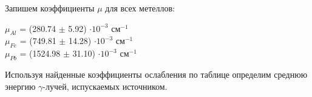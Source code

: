     Запишем коэффициенты $\mu$ для всех метеллов:

    \begin{center}
        $\mu_{Al}$ = (280.74 $\pm$ 5.92) $\cdot 10^{-3}$ см$^{-1}$ \\
        $\mu_{Fe}$ = (749.81 $\pm$ 14.28) $\cdot 10^{-3}$ см$^{-1}$ \\
        $\mu_{Pb}$ = (1524.98 $\pm$ 31.10) $\cdot 10^{-3}$ см$^{-1}$ \\
    \end{center}

    Используя найденные коэффициенты ослабления по таблице определим среднюю энергию
    $\gamma$-лучей, испускаемых источником.

